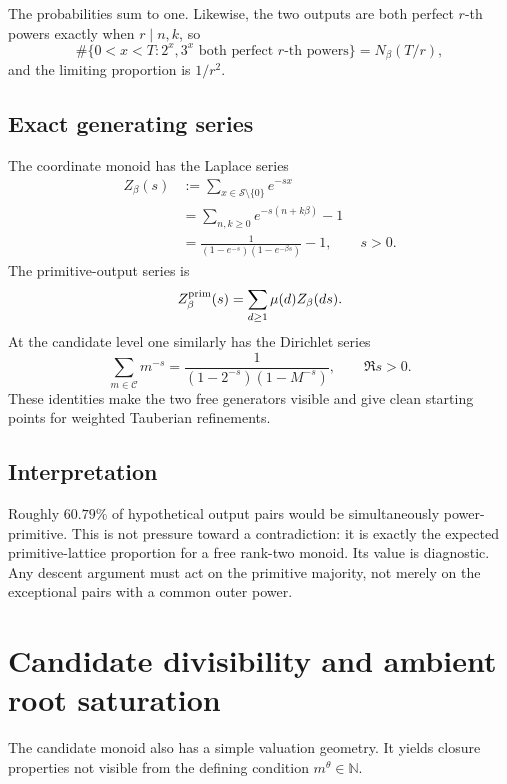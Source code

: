 \documentclass[11pt,oneside]{article}
\theoremstyle{definition}
\newcommand{\N}{\mathbb N}
\newcommand{\Sol}{\mathcal S}
\newcommand{\Cand}{\mathcal C}
\begin{document}
The probabilities sum to one.  Likewise, the two outputs are both perfect \(r\)-th powers
exactly when \(r\mid n,k\), so
\begin{equation}\label{eq:rth-power-frequency}
  \#\{0<x<T:2^x,3^x\text{ both perfect }r\text{-th powers}\}
  =N_\beta(T/r),
\end{equation}
and the limiting proportion is \(1/r^2\).

\subsection{Exact generating series}

The coordinate monoid has the Laplace series
\begin{equation}\label{eq:laplace-series}
\begin{aligned}
  Z_\beta(s)
  &:=\sum_{x\in\Sol\setminus\{0\}}e^{-sx}\\
  &=\sum_{n,k\ge0}e^{-s(n+k\beta)}-1\\
  &=\boxed{\frac1{(1-e^{-s})(1-e^{-\beta s})}-1},
  \qquad s>0.
\end{aligned}
\end{equation}
The primitive-output series is
\[
  Z_\beta^{\rm prim}(s)=\sum_{d\ge1}\mu(d)Z_\beta(ds).
\]
At the candidate level one similarly has the Dirichlet series
\[
  \sum_{m\in\Cand}m^{-s}
  =\frac1{(1-2^{-s})(1-M^{-s})},
  \qquad \Re s>0.
\]
These identities make the two free generators visible and give clean starting points for
weighted Tauberian refinements.

\subsection{Interpretation}

Roughly \(60.79\%\) of hypothetical output pairs would be simultaneously
power-primitive.  This is not pressure toward a contradiction: it is exactly the expected
primitive-lattice proportion for a free rank-two monoid.  Its value is diagnostic.  Any
descent argument must act on the primitive majority, not merely on the exceptional pairs
with a common outer power.

\section{Candidate divisibility and ambient root saturation}\label{sec:lattice}

The candidate monoid also has a simple valuation geometry.  It yields closure properties
not visible from the defining condition \(m^\theta\in\N\).
\end{document}
